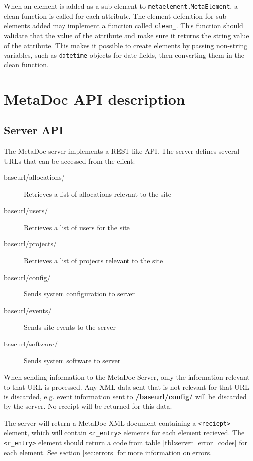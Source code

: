 \documentclass[titlepage, a4paper,10pt]{article}
\begin{document}
When an element is added as a sub-element to \texttt{metaelement.MetaElement}, a 
clean function is called for each attribute. The element defenition for 
sub-elements added may implement a function called 
\texttt{clean\_<attribute name>}. This function should validate that the value 
of the attribute and make sure it returns the string value of the attribute. 
This makes it possible to create elements by passing non-string variables, such 
as \texttt{datetime} objects for date fields, then converting them in the clean 
function. 

\newpage
\section{MetaDoc API description}

\subsection{Server API}

The MetaDoc server implements a REST-like API. The server defines several URLs 
that can be accessed from the client:

\begin{description}
    \item[baseurl/allocations/] Retrieves a list of allocations relevant to the 
        site
    \item[baseurl/users/] Retrieves a list of users for the site
    \item[baseurl/projects/] Retrieves a list of projects relevant to the site
    \item[baseurl/config/] Sends system configuration to server
    \item[baseurl/events/] Sends site events to the server
    \item[baseurl/software/] Sends system software to server
\end{description}

When sending information to the MetaDoc Server, only the information relevant to 
that URL is processed. Any XML data sent that is not relevant for that URL is 
discarded, e.g. event information sent to \textbf{/baseurl/config/} will be 
discarded by the server. No receipt will be returned for this data.  

The server will return a MetaDoc XML document containing a \texttt{<reciept>} 
element, which will contain \texttt{<r\_entry>} elements for each element 
recieved. The \texttt{<r\_entry>} element should return a code from table 
\ref{tbl:server_error_codes} for each element. See section \ref{sec:errors} for 
more information on errors. 
\end{document}
